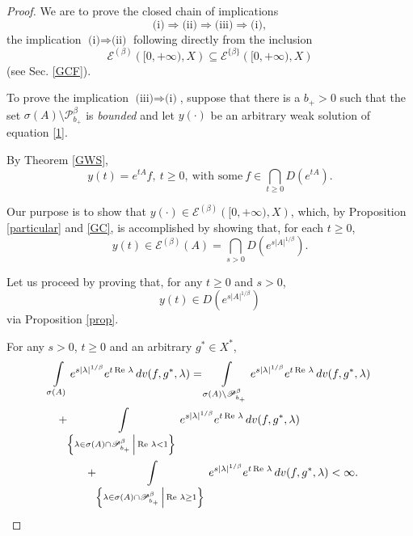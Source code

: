 \documentclass{amsart}
\theoremstyle{plain}
\theoremstyle{definition}
\begin{document}
\begin{proof}
We are to prove the closed chain of implications
\begin{equation*}
\text{(i)}\Rightarrow \text{(ii)}\Rightarrow
\text{(iii)}\Rightarrow
\text{(i)},
\end{equation*} 
the implication $\text{(i)}\Rightarrow \text{(ii)}$
following directly from the inclusion
\[
{\mathscr E}^{(\beta )}\left([0,+\infty),X\right)
\subseteq {\mathscr E}^{\{\beta\}}\left( [0,+\infty),X\right)
\]
(see Sec. \ref{GCF}).

To prove the implication $\text{(iii)}\Rightarrow \text{(i)}$, suppose that there is a $b_+>0$ such that the set $\sigma(A)\setminus{\mathscr P}_{b_+}^\beta$ 
is \textit{bounded} and let $y(\cdot)$ be an arbitrary weak solution of equation \eqref{1}. 

By Theorem \ref{GWS}, 
\begin{equation*}
y(t)=e^{tA}f,\ t\ge 0,\ \text{with some}\
f \in \bigcap_{t\ge 0}D(e^{tA}).
\end{equation*}

Our purpose is to show that $y(\cdot)\in {\mathscr E}^{(\beta )}\left([0,+\infty),X\right)$, which, by Proposition \ref{particular} and \eqref{GC}, is accomplished by showing that, for each $t\ge 0$,
\[
y(t)\in {\mathscr E}^{(\beta )}\left(A\right)
=\bigcap_{s>0} D(e^{s|A|^{1/\beta}}).
\]

Let us proceed by proving that, for any $t\ge 0$ and $s>0$,
\[
y(t)\in D(e^{s|A|^{1/\beta}})
\] 
via Proposition \ref{prop}.

For any $s>0$, $t\ge 0$ and an arbitrary $g^*\in X^*$,
\begin{multline}\label{first}
\int\limits_{\sigma(A)}e^{s|\lambda|^{1/\beta}}e^{t\operatorname{Re\,}\lambda}\,dv(f,g^*,\lambda)
=\int\limits_{\sigma(A)\setminus{\mathscr P}_{b_+}^\beta}e^{s|\lambda|^{1/\beta}}e^{t\operatorname{Re\,}\lambda}\,dv(f,g^*,\lambda)
\\
\shoveleft{
+\int\limits_{\left\{\lambda\in \sigma(A)\cap{\mathscr P}_{b_+}^\beta\,\middle|\,\operatorname{Re\,}\lambda<1 \right\}}e^{s|\lambda|^{1/\beta}}e^{t\operatorname{Re\,}\lambda}\,dv(f,g^*,\lambda)
}\\
\hspace{1.2cm}
+\int\limits_{\left\{\lambda\in \sigma(A)\cap{\mathscr P}_{b_+}^\beta\,\middle|\,\operatorname{Re\,}\lambda\ge 1 \right\}}e^{s|\lambda|^{1/\beta}}e^{t\operatorname{Re\,}\lambda}\,dv(f,g^*,\lambda)<\infty.
\hfill
\end{multline}


\end{proof}
\end{document}
